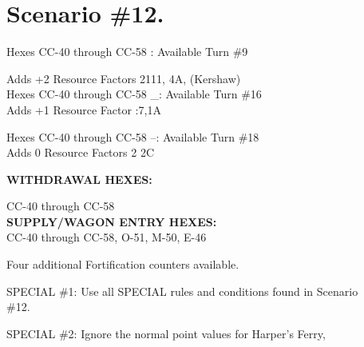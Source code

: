 \section{Scenario \#12.
}


\begin{scenariodata}
Hexes CC-40 through CC-58 : Available Turn \#9\\
\end{scenariodata}

\begin{scenariodata}
Adds +2 Resource Factors 2111, 4A, (Kershaw)\\
Hexes CC-40 through CC-58 \_: Available Turn \#16\\
Adds +1 Resource Factor :7,1A\\
\end{scenariodata}

\begin{scenariodata}
Hexes CC-40 through CC-58 --: Available Turn \#18\\
Adds 0 Resource Factors 2 2C\\
\end{scenariodata}

\begin{scenariodata}
\textbf{WITHDRAWAL HEXES:}\\
\end{scenariodata}

\begin{scenariodata}
CC-40 through CC-58\\
\textbf{SUPPLY/WAGON ENTRY HEXES:}\\
CC-40 through CC-58, O-51, M-50, E-46\\
\end{scenariodata}

\begin{scenariodata}
Four additional Fortification counters available.\\
\end{scenariodata}

\begin{scenariodata}
SPECIAL \#1: Use all SPECIAL rules and conditions found in Scenario\\
\#12.\\
\end{scenariodata}

\begin{scenariodata}
SPECIAL \#2: Ignore the normal point values for Harper's Ferry,\\
\end{scenariodata}

